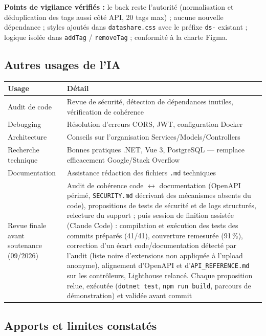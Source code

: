 \documentclass[12pt,a4paper]{article}
\begin{document}
\textbf{Points de vigilance v\'erifi\'es :} le back reste l'autorit\'e (normalisation et d\'eduplication des tags aussi c\^ot\'e API, 20 tags max) ; aucune nouvelle d\'ependance ; styles ajout\'es dans \texttt{datashare.css} avec le pr\'efixe \texttt{ds-} existant ; logique isol\'ee dans \texttt{addTag} / \texttt{removeTag} ; conformit\'e \`a la charte Figma.

\subsection{Autres usages de l'IA}

\begin{longtable}{p{4cm} p{10cm}}
\toprule
\textbf{Usage} & \textbf{D\'etail} \\
\midrule
\endhead
Audit de code & Revue de s\'ecurit\'e, d\'etection de d\'ependances inutiles, v\'erification de coh\'erence \\
Debugging & R\'esolution d'erreurs CORS, JWT, configuration Docker \\
Architecture & Conseils sur l'organisation Services/Models/Controllers \\
Recherche technique & Bonnes pratiques .NET, Vue 3, PostgreSQL --- remplace efficacement Google/Stack Overflow \\
Documentation & Assistance r\'edaction des fichiers \texttt{.md} techniques \\
Revue finale avant soutenance (09/2026) & Audit de coh\'erence code $\leftrightarrow$ documentation (OpenAPI p\'erim\'e, \texttt{SECURITY.md} d\'ecrivant des m\'ecanismes absents du code), propositions de tests de s\'ecurit\'e et de logs structur\'es, relecture du support ; puis session de finition assist\'ee (Claude Code) : compilation et ex\'ecution des tests des commits pr\'epar\'es (41/41), couverture remesur\'ee (91\,\%), correction d'un \'ecart code/documentation d\'etect\'e par l'audit (liste noire d'extensions non appliqu\'ee \`a l'upload anonyme), alignement d'OpenAPI et d'\texttt{API\_REFERENCE.md} sur les contr\^oleurs, Lighthouse relanc\'e. Chaque proposition relue, ex\'ecut\'ee (\texttt{dotnet test}, \texttt{npm run build}, parcours de d\'emonstration) et valid\'ee avant commit \\
\bottomrule
\end{longtable}

\subsection{Apports et limites constat\'es}
\end{document}

